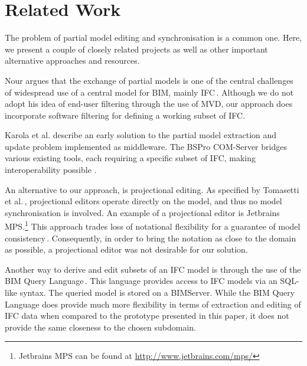 \section{Related Work}
\label{sec:related_work}
The problem of partial model editing and synchronisation is a common one. Here, we present a couple of closely related projects as well as other important alternative approaches and resources.

Nour argues that the exchange of partial models is one of the central challenges of widespread use of a central model for BIM, mainly IFC\,\cite{nour08}. Although we do not adopt his idea of end-user filtering through the use of MVD, our approach does incorporate software filtering for defining a working subset of IFC.

Karola et al. describe an early solution to the partial model extraction and update problem implemented as middleware. The BSPro COM-Server bridges various existing tools, each requiring a specific subset of IFC, making interoperability possible \cite{karola02}.

An alternative to our approach, is projectional editing. As specified by Tomasetti et al.\,\cite{tomasetti11}, projectional editors operate directly on the model, and thus no model synchronisation is involved. An example of a projectional editor is Jetbrains MPS.\footnote{Jetbrains MPS can be found at \url{http://www.jetbrains.com/mps/}} This approach trades loss of notational flexibility for a guarantee of model consistency\,\cite{conf/models/Voelter10}. Consequently, in order to bring the notation as close to the domain as possible, a projectional editor was not desirable for our solution.

Another way to derive and edit subsets of an IFC model is through the use of the BIM Query Language\,\cite{mazairac10}. This language provides access to IFC models via an SQL-like syntax. The queried model is stored on a BIMServer. While the BIM Query Language does provide much more flexibility in terms of extraction and editing of IFC data when compared to the prototype presented in this paper, it does not provide the same closeness to the chosen subdomain.

